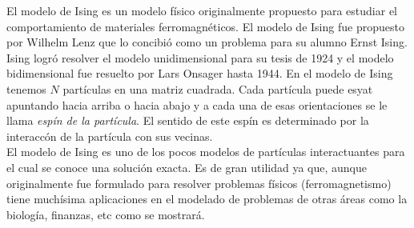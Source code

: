 \documentclass[portrait, a0b,final]{a0poster}%
\numberwithin{equation}{section}
\newenvironment{poster}{
  \begin{center}
  \begin{minipage}[c]{0.98\textwidth}
}{
  \end{minipage}
  \end{center}
}
\newenvironment{pcolumn}[1]{
  \begin{minipage}{#1\textwidth}
  \begin{center}
}{
  \end{center}
  \end{minipage}
}
\newcommand{\pbox}[4]{
\psshadowbox[#3]{
\begin{minipage}[t][#2][t]{#1}
#4
\end{minipage}
}}
\begin{document}
\begin{poster}
\begin{center}
\begin{pcolumn}{0.32}
{    El modelo de Ising es un modelo f\'isico originalmente propuesto para estudiar el comportamiento de materiales ferromagn\'eticos.
    El modelo de Ising fue propuesto por Wilhelm Lenz que lo concibi\'o como un problema para su alumno Ernst Ising. Ising logr\'o resolver el modelo unidimensional para su tesis de 1924 y el modelo bidimensional fue resuelto por Lars Onsager hasta 1944. En el modelo de Ising tenemos $N$ part\'iculas en una matriz cuadrada. Cada part\'icula puede esyat apuntando hacia arriba o hacia abajo y a cada una de esas orientaciones se le llama \textit{esp\'in de la part\'icula}. El sentido de este esp\'in es determinado por la interacc\'on de la part\'icula con sus vecinas. \\

    El modelo de Ising es uno de los pocos modelos de part\'iculas interactuantes para el cual se conoce una soluci\'on exacta. Es de gran utilidad ya que, aunque originalmente fue formulado para resolver problemas f\'isicos (ferromagnetismo) tiene much\'isima aplicaciones en el modelado de problemas de otras \'areas como la biolog\'ia, finanzas, etc como se mostrar\'a.\\

  

    \vspace{2cm}
    \begin{center}
        \pbox{0.8\textwidth}{}%
        {linewidth=2mm,framearc=0.1,linecolor=lightblue,fillstyle=gradient,gradangle=0,%
        gradbegin=white,gradend=whiteblue,gradmidpoint=1.0,framesep=1em}{%
        \begin{center}
            Modelo de Ising
        \end{center}}
    \end{center}
    \vspace{1.25cm}
    \setcounter{section}{3}%
\setcounter{equation}{0}%

}
\end{pcolumn}
\end{center}
\end{poster}
\end{document}
